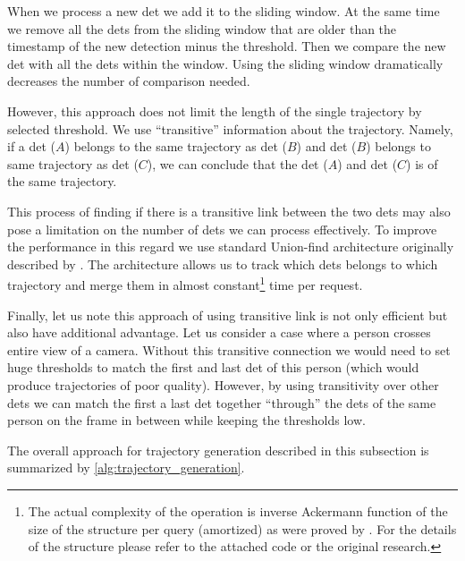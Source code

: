 When we process a new \gls{det} we add it to the sliding window. At the same time we remove all the \glspl{det} from the sliding window that are older than the timestamp of the new detection minus the threshold. Then we compare the new \gls{det} with all the \glspl{det} within the window. Using the sliding window dramatically decreases the number of comparison needed.

However, this approach does not limit the length of the single trajectory by selected threshold. We use ``transitive'' information about the trajectory. Namely, if a \gls{det} ($A$) belongs to the same trajectory as \gls{det} ($B$) and \gls{det} ($B$) belongs to same trajectory as \gls{det} ($C$), we can conclude that the \gls{det} ($A$) and \gls{det} ($C$) is of the same trajectory.

This process of finding if there is a transitive link between the two \glspl{det} may also pose a limitation on the number of \glspl{det} we can process effectively. To improve the performance in this regard we use standard Union-find architecture originally described by \cite{galler1964improved}. The architecture allows us to track which \glspl{det} belongs to which trajectory and merge them in almost constant\footnote{The actual complexity of the operation is inverse Ackermann function of the size of the structure per query (amortized) as were proved by \cite{tarjan1984worst}. For the details of the structure please refer to the attached code or the original research.} time per request.

Finally, let us note this approach of using transitive link is not only efficient but also have additional advantage. Let us consider a case where a person crosses entire view of a camera. Without this transitive connection we would need to set huge thresholds to match the first and last \gls{det} of this person (which would produce trajectories of poor quality). However, by using transitivity over other \glspl{det} we can match the first a last \gls{det} together ``through'' the \glspl{det} of the same person on the frame in between while keeping the thresholds low.

The overall approach for trajectory generation described in this subsection is summarized by \autoref{alg:trajectory_generation}.

